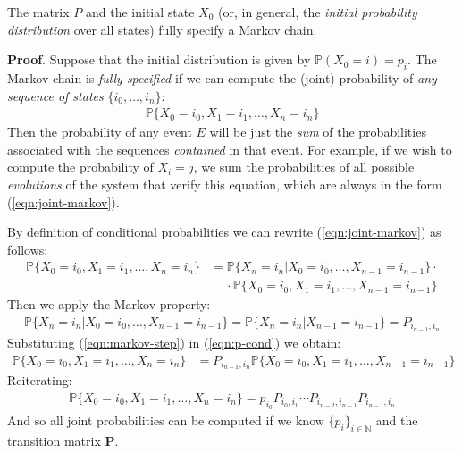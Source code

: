 \documentclass[../template.tex]{subfiles}
\begin{document}
The matrix $P$ and the initial state $X_0$ (or, in general, the \textit{initial probability distribution} over all states) fully specify a Markov chain. 

\medskip

\textbf{Proof}. Suppose that the initial distribution is given by $\mathbb{P}(X_0 = i) = p_i$. The Markov chain is \textit{fully specified} if we can compute the (joint) probability of \textit{any sequence of states} $\{i_0, \dots, i_n\}$:
\begin{align}\label{eqn:joint-markov}
    \mathbb{P}\{X_0 = i_0, X_1 = i_1, \dots, X_n = i_n\}
\end{align}   
Then the probability of any event $E$ will be just the \textit{sum} of the probabilities associated with the sequences \textit{contained} in that event. For example, if we wish to compute the probability of $X_{i} = j$, we sum the probabilities of all possible \textit{evolutions} of the system that verify this equation, which are always in the form (\ref{eqn:joint-markov}).

\medskip

By definition of conditional probabilities we can rewrite (\ref{eqn:joint-markov}) as follows:
\begin{align}\nonumber
    \mathbb{P}\{X_0 = i_0, X_1=i_1, \dots, X_n=i_n\} &= 
    \mathbb{P}\{X_{n}=i_n|X_0=i_0, \dots, X_{n-1}=i_{n-1}\} \cdot\\
    &\quad\> \cdot
    \mathbb{P}\{X_0=i_0, X_1=i_1, \dots, X_{n-1}=i_{n-1}\} \label{eqn:p-cond}
\end{align}
Then we apply the Markov property:
\begin{align}\label{eqn:markov-step}
    \mathbb{P}\{X_{n}=i_n|X_0=i_0, \dots, X_{n-1}=i_{n-1}\} = \mathbb{P}\{X_n=i_n|X_{n-1}=i_{n-1}\} = P_{i_{n-1}, i_n}
\end{align}
Substituting (\ref{eqn:markov-step}) in (\ref{eqn:p-cond}) we obtain:
\begin{align*}
    \mathbb{P}\{X_0 = i_0, X_1=i_1, \dots, X_n=i_n\} &= P_{i_{n-1}, i_n} \mathbb{P}\{X_0=i_0, X_1=i_1, \dots, X_{n-1}=i_{n-1}\}
\end{align*}
Reiterating:
\begin{align*}
    \mathbb{P}\{X_0 = i_0, X_1=i_1, \dots, X_n=i_n\} = p_{i_0} P_{i_0,i_1} \cdots P_{i_{n-2}, i_{n-1}} P_{i_{n-1}, i_n}
\end{align*}
And so all joint probabilities can be computed if we know $\{p_i\}_{i\in \mathbb{N}}$ and the transition matrix \textbf{P}.
\end{document}
